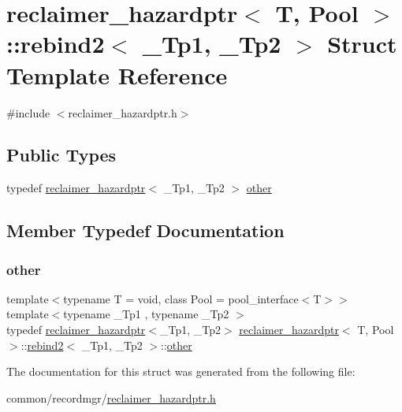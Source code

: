 \hypertarget{structreclaimer__hazardptr_1_1rebind2}{}\section{reclaimer\+\_\+hazardptr$<$ T, Pool $>$\+:\+:rebind2$<$ \+\_\+\+Tp1, \+\_\+\+Tp2 $>$ Struct Template Reference}
\label{structreclaimer__hazardptr_1_1rebind2}


{\ttfamily \#include $<$reclaimer\+\_\+hazardptr.\+h$>$}

\subsection*{Public Types}
\begin{DoxyCompactItemize}
\item 
typedef \hyperlink{classreclaimer__hazardptr}{reclaimer\+\_\+hazardptr}$<$ \+\_\+\+Tp1, \+\_\+\+Tp2 $>$ \hyperlink{structreclaimer__hazardptr_1_1rebind2_ae20c7a2f7e9e83f60769326b03bf5411}{other}
\end{DoxyCompactItemize}


\subsection{Member Typedef Documentation}
\mbox{\label{structreclaimer__hazardptr_1_1rebind2_ae20c7a2f7e9e83f60769326b03bf5411}} 
\subsubsection{\texorpdfstring{other}{other}}
{\footnotesize\ttfamily template$<$typename T  = void, class Pool  = pool\+\_\+interface$<$\+T$>$$>$ \\
template$<$typename \+\_\+\+Tp1 , typename \+\_\+\+Tp2 $>$ \\
typedef \hyperlink{classreclaimer__hazardptr}{reclaimer\+\_\+hazardptr}$<$\+\_\+\+Tp1, \+\_\+\+Tp2$>$ \hyperlink{classreclaimer__hazardptr}{reclaimer\+\_\+hazardptr}$<$ T, Pool $>$\+::\hyperlink{structreclaimer__hazardptr_1_1rebind2}{rebind2}$<$ \+\_\+\+Tp1, \+\_\+\+Tp2 $>$\+::\hyperlink{structreclaimer__hazardptr_1_1rebind2_ae20c7a2f7e9e83f60769326b03bf5411}{other}}



The documentation for this struct was generated from the following file\+:\begin{DoxyCompactItemize}
\item 
common/recordmgr/\hyperlink{reclaimer__hazardptr_8h}{reclaimer\+\_\+hazardptr.\+h}\end{DoxyCompactItemize}
